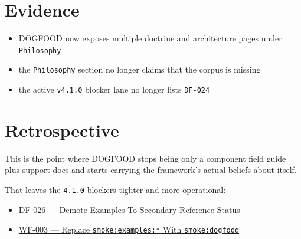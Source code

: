 \section{Evidence}\label{record-085-evidence}

\begin{itemize}
\tightlist
\item
  DOGFOOD now exposes multiple doctrine and architecture pages under \texttt{P\allowbreak{}h\allowbreak{}i\allowbreak{}l\allowbreak{}o\allowbreak{}s\allowbreak{}o\allowbreak{}p\allowbreak{}h\allowbreak{}y}
\item
  the \texttt{P\allowbreak{}h\allowbreak{}i\allowbreak{}l\allowbreak{}o\allowbreak{}s\allowbreak{}o\allowbreak{}p\allowbreak{}h\allowbreak{}y} section no longer claims that the corpus is missing
\item
  the active \texttt{v\allowbreak{}4\allowbreak{}.\allowbreak{}1\allowbreak{}.\allowbreak{}0} blocker lane no longer lists \texttt{D\allowbreak{}F\allowbreak{}-\allowbreak{}0\allowbreak{}2\allowbreak{}4}
\end{itemize}

\section{Retrospective}\label{record-085-retrospective}

This is the point where DOGFOOD stops being only a component field guide plus support docs and starts carrying the framework's actual beliefs about itself.

That leaves the \texttt{4\allowbreak{}.\allowbreak{}1\allowbreak{}.\allowbreak{}0} blockers tighter and more operational:

\begin{itemize}
\tightlist
\item
  \href{https://github.com/flyingrobots/bijou/blob/cbd70612140e7a450d764b3c7be1c6af878b99bc/docs/design/DF-026-demote-examples-to-secondary-reference-status.md}{DF-026 --- Demote Examples To Secondary Reference Status}
\item
  \href{https://github.com/flyingrobots/bijou/blob/cbd70612140e7a450d764b3c7be1c6af878b99bc/docs/design/WF-003-replace-smoke-examples-with-smoke-dogfood.md}{WF-003 --- Replace \texttt{s\allowbreak{}m\allowbreak{}o\allowbreak{}k\allowbreak{}e\allowbreak{}:\allowbreak{}e\allowbreak{}x\allowbreak{}a\allowbreak{}m\allowbreak{}p\allowbreak{}l\allowbreak{}e\allowbreak{}s\allowbreak{}:\allowbreak{}*} With \texttt{s\allowbreak{}m\allowbreak{}o\allowbreak{}k\allowbreak{}e\allowbreak{}:\allowbreak{}d\allowbreak{}o\allowbreak{}g\allowbreak{}f\allowbreak{}o\allowbreak{}o\allowbreak{}d}}
\end{itemize}

